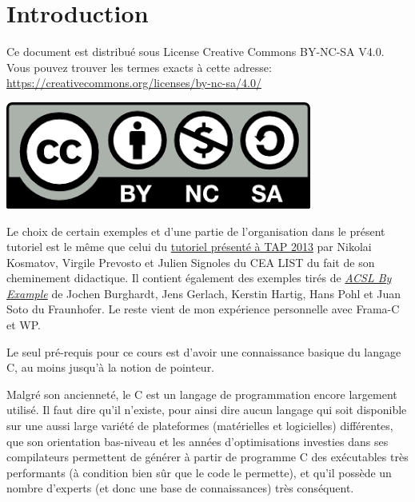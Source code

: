 \documentclass[12pt,francais,]{scrbook}
\title{\color{white}{INTRODUCTION À LA PREUVE DE PROGRAMMES C AVEC FRAMA-C ET SON GREFFON WP}}
\author{\color{ocre}{Allan Blanchard}}
\date{\color{white}{$ $\\22 juin 2017}}
\newenvironment{zdsblock}[1]{%
  \tcolorbox[beamer,%
    noparskip,breakable,
    colback=LightBlue,colframe=DarkBlue,%
    colbacklower=DarkBlue,%
    title=#1]
}{\endtcolorbox}
\begin{document}
\maketitle
\ClearWallPaper

{
\hypersetup{linkcolor=ocre}
\setcounter{tocdepth}{2}
\tableofcontents
}
\chapter{Introduction}\label{introduction}

\begin{zdsblock}{License}
  Ce document est distribué sous License Creative Commons BY-NC-SA V4.0.
  Vous pouvez trouver les termes exacts à cette adresse:
  \href{https://creativecommons.org/licenses/by-nc-sa/4.0/}
       {https://creativecommons.org/licenses/by-nc-sa/4.0/}
  \begin{center}
    \includegraphics[width=.3\textwidth]{cc-by-nc-sa.png}
  \end{center}
\end{zdsblock}

\begin{zdsblock}{Information}
Le choix de certain exemples et d'une
partie de l'organisation dans le présent tutoriel est le même
  que celui du
  \href{http://www.spacios.eu/TAP2013/keynotes.html}{tutoriel présenté à
    TAP 2013} par Nikolai Kosmatov, Virgile Prevosto et Julien
Signoles du CEA LIST du fait de son cheminement didactique.
Il contient également des exemples tirés de
\emph{\href{https://github.com/fraunhoferfokus/acsl-by-example}{ACSL
By Example}} de Jochen Burghardt, Jens Gerlach, Kerstin
Hartig, Hans Pohl et Juan Soto du Fraunhofer. Le reste vient
de mon expérience personnelle avec Frama-C et WP.

Le seul pré-requis pour ce cours est d'avoir une connaissance basique du
langage C, au moins jusqu'à la notion de pointeur.
\end{zdsblock}

Malgré son ancienneté, le C est un langage de programmation encore
largement utilisé. Il faut dire qu'il n'existe, pour ainsi dire aucun
langage qui soit disponible sur une aussi large variété de plateformes
(matérielles et logicielles) différentes, que son orientation bas-niveau
et les années d'optimisations investies dans ses compilateurs permettent
de générer à partir de programme C des exécutables très performants (à
condition bien sûr que le code le permette), et qu'il possède un nombre
d'experts (et donc une base de connaissances) très conséquent.
\end{document}
